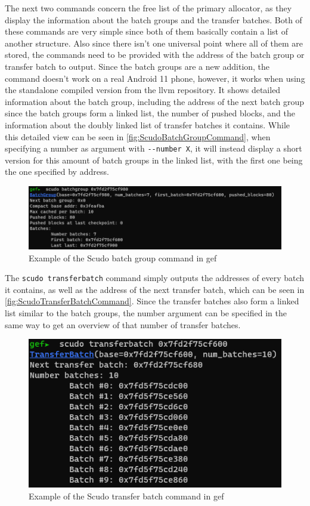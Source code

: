 \documentclass[a4paper,11pt,oneside]{report}
\begin{document}
The next two commands concern the free list of the primary allocator, as they
display the information about the batch groups and the transfer batches. Both
of these commands are very simple since both of them basically contain a list
of another structure. Also since there isn't one universal point where all of
them are stored, the commands need to be provided with the address of the
batch group or transfer batch to output.
Since the batch groups are a new addition, the command doesn't work on a real
Android 11 phone, however, it works when using the standalone compiled version
from the llvm repository. It shows detailed information about the batch group,
including the address of the next batch group since the batch groups form a
linked list, the number of pushed blocks, and the information about the doubly
linked list of transfer batches it contains. While this detailed view can be
seen in \autoref{fig:ScudoBatchGroupCommand}, when specifying a number as
argument with \verb|--number X|, it will instead display a short version for this
amount of batch groups in the linked list, with the first one being the one
specified by address.

\begin{figure}[h!]
  \centering
  \includegraphics[width=\linewidth]{figures/ScudoBatchGroupCommand.png}
  \caption{Example of the Scudo batch group command in gef}
  \label{fig:ScudoBatchGroupCommand}
\end{figure}

The \verb|scudo transferbatch| command simply outputs the addresses of every batch
it contains, as well as the address of the next transfer batch, which can be seen
in \autoref{fig:ScudoTransferBatchCommand}. Since the transfer batches also
form a linked list similar to the batch groups, the number argument can be
specified in the same way to get an overview of that number of transfer batches.

\begin{figure}[h!]
  \centering
  \includegraphics{figures/ScudoTransferBatchCommand.png}
  \caption{Example of the Scudo transfer batch command in gef}
  \label{fig:ScudoTransferBatchCommand}
\end{figure}
\end{document}

